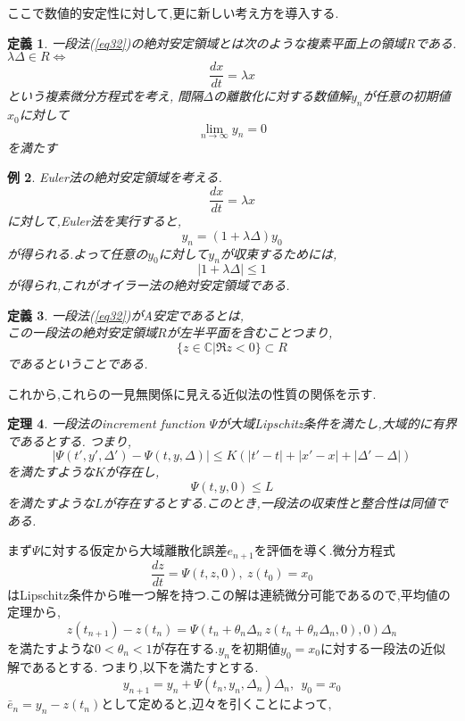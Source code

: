 \documentclass[a4paper]{jreport}
\def\qedsymbol{$\square$}
\def\proofname{\gt{証明}\;}
\newenvironment{Proof}{\par\noindent{\it\proofname}}{{\unskip\nobreak\hfill{\it\qedsymbol}}\par\vskip 9pt}
\numberwithin{equation}{section}
\newtheorem{Thm}     {定理}[section]
\newtheorem{Def}     [Thm]{定義}
\newtheorem{Ex}      [Thm]{例}
\renewenvironment{leftbar}{%
  \def\FrameCommand{\vrule width 1pt \hspace{10pt}}%
  \MakeFramed {\advance\hsize-\width \FrameRestore}}%
 {\endMakeFramed}
\def\C{\mathbb C}
\def\iff{\Leftrightarrow}
\def\thm{\begin{leftbar}\begin{Thm}}
\def\thmx{\end{Thm}\end{leftbar}}
\def\defb{\begin{leftbar}\begin{Def}}
\def\defx{\end{Def}\end{leftbar}}
\def\ex{\begin{Ex}}
\def\exx{\end{Ex}}
\def\proof{\begin{Proof}}
\begin{document}
ここで数値的安定性に対して,更に新しい考え方を導入する.
\defb
一段法(\ref{eq32})の絶対安定領域とは次のような複素平面上の領域$R$である.
\\
$\lambda \Delta \in R \iff $
\[
\frac{dx}{dt} = \lambda x
\]
という複素微分方程式を考え,
間隔$\Delta$の離散化に対する数値解$y_n$が任意の初期値$x_0$に対して
\[
\lim_{n\to\infty} y_n = 0
\]
を満たす
\defx
\ex
Euler法の絶対安定領域を考える.\\
\[
\frac{dx}{dt} = \lambda x
\]
に対して,Euler法を実行すると,\\
\[
y_n = (1+\lambda\Delta)y_0
\]
が得られる.よって任意の$y_0$に対して$y_n$が収束するためには,
\[
|1+\lambda\Delta| \le 1
\]
が得られ,これがオイラー法の絶対安定領域である.
\exx
\defb
一段法(\ref{eq32})がA安定であるとは,\\
この一段法の絶対安定領域$R$が左半平面を含むことつまり,
\[
\{z \in \C | \Re z < 0 \} \subset R
\]
であるということである.
\defx
これから,これらの一見無関係に見える近似法の性質の関係を示す.
\thm
一段法のincrement function $\Psi$が大域Lipschitz条件を満たし,大域的に有界であるとする.
つまり,
\[
|\Psi(t',y',\Delta') -\Psi(t,y,\Delta)| \le K (|t'-t| + |x'-x| + |\Delta' - \Delta|)
\]
を満たすような$K$が存在し,
\[
\Psi(t,y,0) \le L
\]
を満たすような$L$が存在するとする.このとき,一段法の収束性と整合性は同値である.
\thmx
\proof
まず$\Psi$に対する仮定から大域離散化誤差$e_{n+1}$を評価を導く.微分方程式
\[
\frac{dz}{dt} = \Psi(t,z,0) ,\ z(t_0) = x_0
\]
はLipschitz条件から唯一つ解を持つ.この解は連続微分可能であるので,平均値の定理から,
\[
z(t_{n+1}) - z(t_n) = \Psi(t_n+\theta_n\Delta_n \,z(t_n+\theta_n\Delta_n,0),0) \Delta_n
\]
を満たすような$0 < \theta_n < 1$が存在する.$y_n$を初期値$y_0 = x_0$に対する一段法の近似解であるとする.
つまり,以下を満たすとする.
\[
y_{n+1} = y_n + \Psi(t_n,y_n,\Delta_n) \Delta_n,\  \  y_0 = x_0
\]
$\bar{e}_{n} = y_n - z(t_n)$として定めると,辺々を引くことによって,
\end{document}
